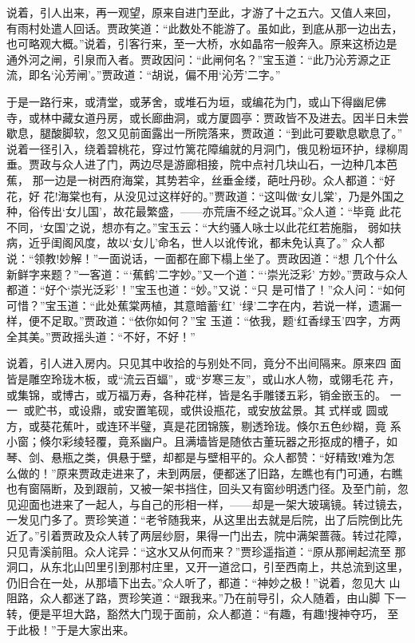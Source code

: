 说着，引人出来，再一观望，原来自进门至此，才游了十之五六。又值人来回，
有雨村处遣人回话。贾政笑道：“此数处不能游了。虽如此，到底从那一边出去，
也可略观大概。”说着，引客行来，至一大桥，水如晶帘一般奔入。原来这桥边是
通外河之闸，引泉而入者。贾政因问：“此闸何名？”宝玉道：“此乃沁芳源之正
流，即名‘沁芳闸’。”贾政道：“胡说，偏不用‘沁芳’二字。”

于是一路行来，或清堂，或茅舍，或堆石为垣，或编花为门，或山下得幽尼佛
寺，或林中藏女道丹房，或长廊曲洞，或方厦圆亭：贾政皆不及进去。因半日未尝
歇息，腿酸脚软，忽又见前面露出一所院落来，贾政道：“到此可要歇息歇息了。”
说着一径引入，绕着碧桃花，穿过竹篱花障编就的月洞门，俄见粉垣环护，绿柳周
垂。贾政与众人进了门，两边尽是游廊相接，院中点衬几块山石，一边种几本芭蕉，
那一边是一树西府海棠，其势若伞，丝垂金缕，葩吐丹砂。众人都道：“好花，好
花!海棠也有，从没见过这样好的。”贾政道：“这叫做‘女儿棠’，乃是外国之
种，俗传出‘女儿国’，故花最繁盛，——亦荒唐不经之说耳。”众人道：“毕竟
此花不同，‘女国’之说，想亦有之。”宝玉云：“大约骚人咏士以此花红若施脂，
弱如扶病，近乎闺阁风度，故以‘女儿’命名，世人以讹传讹，都未免认真了。”
众人都说：“领教!妙解！”一面说话，一面都在廊下榻上坐了。贾政因道：“想
几个什么新鲜字来题？”一客道：“‘蕉鹤’二字妙。”又一个道：“‘崇光泛彩’
方妙。”贾政与众人都道：“好个‘崇光泛彩’！”宝玉也道：“妙。”又说：“只
是可惜了！”众人问：“如何可惜？”宝玉道：“此处蕉棠两植，其意暗蓄‘红’
‘绿’二字在内，若说一样，遗漏一样，便不足取。”贾政道：“依你如何？”宝
玉道：“依我，题‘红香绿玉’四字，方两全其美。”贾政摇头道：“不好，不好！”

说着，引人进入房内。只见其中收拾的与别处不同，竟分不出间隔来。原来四
面皆是雕空玲珑木板，或“流云百蝠”，或“岁寒三友”，或山水人物，或翎毛花
卉，或集锦，或博古，或万福万寿，各种花样，皆是名手雕镂五彩，销金嵌玉的。
一一，或贮书，或设鼎，或安置笔砚，或供设瓶花，或安放盆景。其式样或
圆或方，或葵花蕉叶，或连环半璧，真是花团锦簇，剔透玲珑。倏尔五色纱糊，竟
系小窗；倏尔彩绫轻覆，竟系幽户。且满墙皆是随依古董玩器之形抠成的槽子，如
琴、剑、悬瓶之类，俱悬于壁，却都是与壁相平的。众人都赞：“好精致!难为怎
么做的！”原来贾政走进来了，未到两层，便都迷了旧路，左瞧也有门可通，右瞧
也有窗隔断，及到跟前，又被一架书挡住，回头又有窗纱明透门径。及至门前，忽
见迎面也进来了一起人，与自己的形相一样，——却是一架大玻璃镜。转过镜去，
一发见门多了。贾珍笑道：“老爷随我来，从这里出去就是后院，出了后院倒比先
近了。”引着贾政及众人转了两层纱厨，果得一门出去，院中满架蔷薇。转过花障，
只见青溪前阻。众人诧异：“这水又从何而来？”贾珍遥指道：“原从那闸起流至
那洞口，从东北山凹里引到那村庄里，又开一道岔口，引至西南上，共总流到这里，
仍旧合在一处，从那墙下出去。”众人听了，都道：“神妙之极！”说着，忽见大
山阻路，众人都迷了路，贾珍笑道：“跟我来。”乃在前导引，众人随着，由山脚
下一转，便是平坦大路，豁然大门现于面前，众人都道：“有趣，有趣!搜神夺巧，
至于此极！”于是大家出来。

